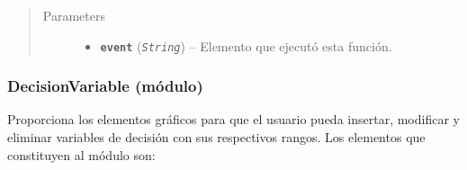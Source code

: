 \documentclass[class=report, crop=false]{standalone}
\begin{document}
\begin{fulllineitems}
\begin{fulllineitems}
\begin{quote}\begin{description}
\item[{Parameters}] \leavevmode\begin{itemize}
\item \textbf{\texttt{event}} (\emph{\texttt{String}}) -- Elemento que ejecutó esta función.
\end{itemize}
\end{description}\end{quote}

\end{fulllineitems}

\end{fulllineitems}

\subsubsection{DecisionVariable (módulo)}
\label{sec:a_3_2_2}

Proporciona los elementos gráficos para que el usuario pueda
insertar, modificar y eliminar variables de decisión con sus 
respectivos rangos.\medskip\break
Los elementos que constituyen al módulo son:

\end{document}
